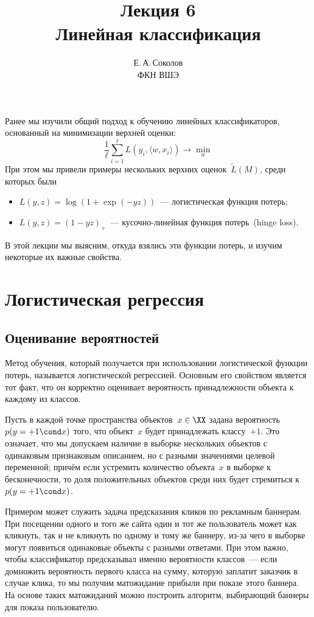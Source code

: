 \documentclass[12pt,fleqn]{article}
\begin{document}
\title{Лекция 6\\Линейная классификация}
\author{Е.\,А.\,Соколов\\ФКН ВШЭ}
\maketitle

Ранее мы изучили общий подход к обучению линейных классификаторов, основанный на минимизации
верхней оценки:
\[
    \frac{1}{\ell}
    \sum_{i = 1}^{\ell}
        L(y_i, \langle w, x_i \rangle)
    \to
    \min_{w}
\]
При этом мы привели примеры нескольких верхних оценок~$\tilde L(M)$,
среди которых были
\begin{itemize}
    \item $L(y, z) = \log(1 + \exp(-yz))$~--- логистическая функция потерь;
    \item $L(y, z) = (1 - yz)_+$~--- кусочно-линейная функция потерь~(hinge loss).
\end{itemize}
В этой лекции мы выясним, откуда взялись эти функции потерь, и изучим некоторые их важные свойства.

\section{Логистическая регрессия}
\subsection{Оценивание вероятностей}
Метод обучения, который получается при использовании логистической функции потерь,
называется логистической регрессией.
Основным его свойством является тот факт, что он корректно оценивает вероятность
принадлежности объекта к каждому из классов.

Пусть в каждой точке пространства объектов~$x \in \XX$ задана вероятность~$p(y = +1 \cond x)$
того, что объект~$x$ будет принадлежать классу~$+1$.
Это означает, что мы допускаем наличие в выборке нескольких объектов
с одинаковым признаковым описанием, но с разными значениями целевой переменной;
причём если устремить количество объекта~$x$ в выборке к бесконечности,
то доля положительных объектов среди них будет стремиться к~$p(y = +1 \cond x)$.

Примером может служить задача предсказания кликов по рекламным баннерам.
При посещении одного и того же сайта один и тот же пользователь может как кликнуть,
так и не кликнуть по одному и тому же баннеру,
из-за чего в выборке могут появиться одинаковые объекты с разными ответами.
При этом важно, чтобы классификатор предсказывал именно вероятности классов~---
если домножить вероятность первого класса на сумму, которую заплатит заказчик в случае клика,
то мы получим матожидание прибыли при показе этого баннера.
На основе таких матожиданий можно построить алгоритм, выбирающий
баннеры для показа пользователю.
\end{document}
